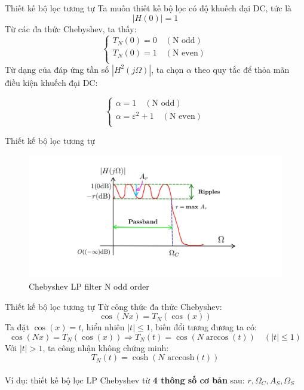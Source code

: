 \documentclass[8pt]{beamer}
\begin{document}
\begin{frame}{Thiết kế bộ lọc tương tự}
Ta muốn thiết kế bộ lọc có độ khuếch đại DC, tức là $$|H(0)|=1$$
Từ các đa thức Chebyshev, ta thấy:
\begin{equation*}
\begin{cases}
T_{N}(0)=0\quad(\text{N odd})\\
T_{N}(0)=1\quad(\text{N even})\\
\end{cases}
\end{equation*}
Từ dạng của đáp ứng tần số $|H^2(j\Omega)|$, ta chọn $\alpha$ theo quy tắc để thỏa mãn điều kiện khuếch đại DC:

\begin{equation*}
\begin{cases}
\alpha=1\quad(\text{N odd})\\
\alpha=\varepsilon^2+1\quad(\text{N even})\\
\end{cases}
\end{equation*}
\end{frame}
\begin{frame}{Thiết kế bộ lọc tương tự}
\begin{figure}[h]
	\includegraphics[width=1\textwidth]{16.jpg}
	\caption{Chebyshev LP filter N odd order}			\label{fig:re2}
		\end{figure}

\end{frame}
\begin{frame}{Thiết kế bộ lọc tương tự}
Từ công thức đa thức Chebyshev: $$\cos(Nx)=T_{N}(\cos(x))$$
Ta đặt $\cos(x)=t$, hiển nhiên $|t|\leq 1$, biến đổi tương đương ta có:
$$\cos(Nx)=T_{N}(\cos(x))\Rightarrow T_{N}(t)=\cos{(N\arccos(t))}\quad (|t|\leq 1)$$
Với $|t|>1$, ta công nhận không chứng minh: $$T_{N}(t)=\cosh(N\text{ arccosh}{(t)})$$
\\ Ví dụ: thiết kế bộ lọc LP Chebyshev từ \textbf{4 thông số cơ bản} sau: $r, \Omega_{C}, A_{S},\Omega_{S}$
\end{frame}
\end{document}
